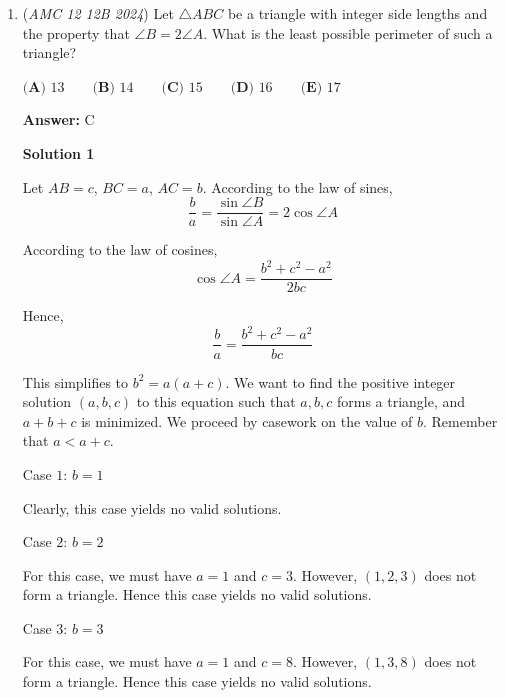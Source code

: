 \begin{enumerate}
 
 \begin{align*}     \cos \theta = \frac{\langle 3, 4 \rangle \cdot \langle 12, 5 \rangle}{\|\langle 3, 4 \rangle\| \, \|\langle 12, 5 \rangle\|} = \frac{3 \cdot 12 + 4 \cdot 5}{5 \cdot 13} = \frac{56}{65} \end{align*}


 This ratio $\cos \theta = \frac{56}{65}$ describes the third triangle to have a hypotenuse with length $65$, one leg with length $56$, and another leg with length $\sqrt{65^2 - 56^2} = \sqrt{(65 - 56)(65 + 56)} = \sqrt{9 \cdot 121} = 33$ by Pythagorean and difference of squares.

 The perimeter is then $65 + 56 + 33 = \boxed{\textbf{(C)\ 154}}$



	\item (\textit{AMC 12 12B 2024}) Let $\triangle ABC$ be a triangle with integer side lengths and the property that $\angle{B} = 2\angle{A}$. What is the least possible perimeter of such a triangle?


 $\textbf{(A) }13 \qquad \textbf{(B) }14 \qquad \textbf{(C) }15 \qquad \textbf{(D) }16 \qquad \textbf{(E) }17 \qquad$

 \textbf{Answer: }C



\textbf{Solution 1}

Let $AB=c$, $BC=a$, $AC=b$. According to the law of sines,
 \[\frac{b}{a}=\frac{\sin \angle B}{\sin \angle A}=2\cos \angle A\]

 According to the law of cosines,
 \[\cos \angle A=\frac{b^2+c^2-a^2}{2bc}\]

 Hence,
 \[\frac{b}{a}=\frac{b^2+c^2-a^2}{bc}\]

 This simplifies to $b^2=a(a+c)$. We want to find the positive integer solution $(a, b, c)$ to this equation such that $a, b, c$ forms a triangle, and $a+b+c$ is minimized. We proceed by casework on the value of $b$. Remember that $a<a+c$.

 Case $1$: $b=1$

 Clearly, this case yields no valid solutions.

 Case $2$: $b=2$

 For this case, we must have $a=1$ and $c=3$. However, $(1, 2, 3)$ does not form a triangle. Hence this case yields no valid solutions.

 Case $3$: $b=3$

 For this case, we must have $a=1$ and $c=8$. However, $(1, 3, 8)$ does not form a triangle. Hence this case yields no valid solutions.


\end{enumerate}
